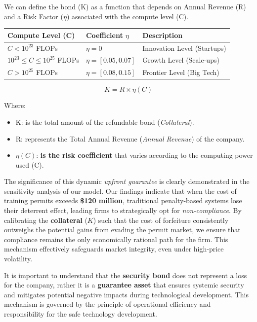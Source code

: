 We can define the bond {(K)} as a function that depends on Annual Revenue {(R)} and a Risk Factor {($\eta$)} associated with the compute level (C).

\begin{table}[h]
\centering
\begin{tabular}{|l|l|l|}
\hline
{Compute Level (C)} & {Coefficient $\eta$} & {Description} \\
\hline
$C < 10^{23}$ FLOPs & $\eta = 0$ & Innovation Level (Startups) \\
\hline
$10^{23} \leq C \leq 10^{25}$ FLOPs & $\eta = [0.05, 0.07]$ & Growth Level (Scale-ups) \\
\hline
$C > 10^{25}$ FLOPs & $\eta = [0.08, 0.15]$ & Frontier Level (Big Tech) \\
\hline
\end{tabular}
\end{table}

\begin{equation}
{K = R \times \eta(C)}
\end{equation}

Where:

\begin{itemize}
    \item {K}: is the total amount of the refundable bond (\textit{Collateral}).
    
    \item {R}: {represents the Total Annual Revenue} (\textit{Annual Revenue}) of the company.
    
    \item {$\eta(C)$}: \textbf{is the risk coefficient} that varies according to the computing power used (C).
\end{itemize}

The significance of this dynamic \textit{upfront guarantee} is clearly demonstrated in the sensitivity analysis of our model. Our findings indicate that when the cost of training permits exceeds \textbf{\$120 million}, traditional penalty-based systems lose their deterrent effect, leading firms to strategically opt for \textit{non-compliance}. By calibrating the \textbf{collateral} {($K$)} such that the cost of forfeiture consistently outweighs the potential gains from evading the permit market, we ensure that compliance remains the only economically rational path for the firm. This mechanism effectively safeguards market integrity, even under high-price volatility.

It is important to understand that the \textbf{security bond} does not represent a loss for the company, rather it is a \textbf{guarantee asset} that ensures systemic security and mitigates potential negative impacts during technological development. This mechanism is governed by the principle of operational efficiency and responsibility for the safe technology development.


